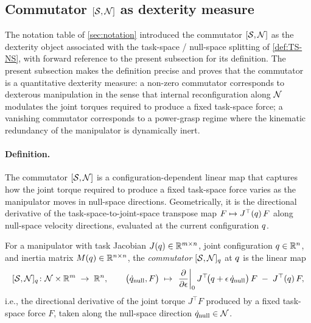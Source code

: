 \subsection{Commutator $[\TS, \NS]$ as dexterity measure}
\label{sec:hierarchical-commutator}

The notation table of \cref{sec:notation} introduced the
commutator $[\TS, \NS]$ as the dexterity object associated with
the task-space / null-space splitting of \cref{def:TS-NS}, with
forward reference to the present subsection for its definition.
The present subsection makes the definition precise and proves
that the commutator is a quantitative dexterity measure: a
non-zero commutator corresponds to dexterous manipulation in the
sense that internal reconfiguration along $\mathcal{N}$ modulates the
joint torques required to produce a fixed task-space force; a
vanishing commutator corresponds to a power-grasp regime where
the kinematic redundancy of the manipulator is dynamically inert.

\paragraph{Definition.}
The commutator $[\TS, \NS]$ is a configuration-dependent linear
map that captures how the joint torque required to produce a
fixed task-space force varies as the manipulator moves in
null-space directions. Geometrically, it is the directional
derivative of the task-space-to-joint-space transpose map
$F \mapsto J^{\top}(q)\, F$ along null-space velocity
directions, evaluated at the current configuration $q$.

\begin{definition}[Commutator {$[\TS, \NS]$}]
\label{def:commutator}
For a manipulator with task Jacobian
$J(q) \in \mathbb{R}^{m \times n}$, joint configuration
$q \in \mathbb{R}^{n}$, and inertia matrix
$M(q) \in \mathbb{R}^{n \times n}$, the
\emph{commutator} $[\mathcal{S}, \mathcal{N}]_{q}$ at $q$ is the
linear map
\[
  [\mathcal{S}, \mathcal{N}]_{q} \colon
  \mathcal{N} \times \mathbb{R}^{m} \;\to\; \mathbb{R}^{n},
  \qquad
  \bigl(\dot{q}_{\mathrm{null}}, F\bigr)
  \;\mapsto\;
  \left.\frac{\partial}{\partial \epsilon}\right|_{0}
  J^{\top}\!\bigl(q + \epsilon\, \dot{q}_{\mathrm{null}}\bigr)\, F
  \;-\;
  J^{\top}(q)\, F,
\]
i.e., the directional derivative of the joint torque
$J^{\top} F$ produced by a fixed task-space force $F$, taken
along the null-space direction
$\dot{q}_{\mathrm{null}} \in \mathcal{N}$.
\end{definition}

